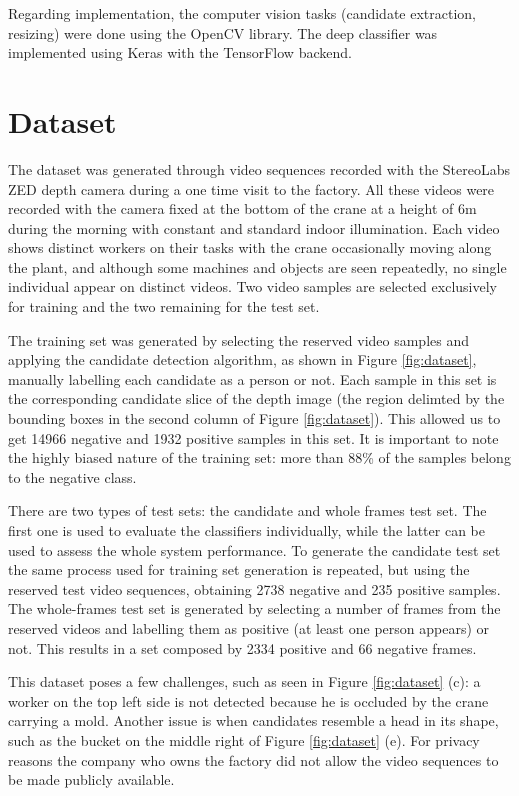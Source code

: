         Regarding implementation, the computer vision tasks (candidate extraction, resizing) were done using the OpenCV library. The deep classifier was implemented using Keras \cite{keras} with the TensorFlow \cite{tensorflow2015-whitepaper} backend.

\section{Dataset}
\label{sec:dataset}
The dataset was generated through video sequences recorded with the StereoLabs ZED depth camera during a one time visit to the factory. All these videos were recorded with the camera fixed at the bottom of the crane at a height of 6m during the morning with constant and standard indoor illumination. Each video shows distinct workers on their tasks with the crane occasionally moving along the plant, and although some machines and objects are seen repeatedly, no single individual appear on distinct videos. Two video samples are selected exclusively for training and the two remaining for the test set.

The training set was generated by selecting the reserved video samples and applying the candidate detection algorithm, as shown in Figure \ref{fig:dataset}, manually labelling each candidate as a person or not. Each sample in this set is the corresponding candidate slice of the depth image (the region delimted by the bounding boxes in the second column of Figure \ref{fig:dataset}). This allowed us to get 14966 negative and 1932 positive samples in this set. It is important to note the highly biased nature of the training set: more than 88\% of the samples belong to the negative class.

There are two types of test sets: the candidate and whole frames test set. The first one is used to evaluate the classifiers individually, while the latter can be used to assess the whole system performance. To generate the candidate test set the same process used for training set generation is repeated, but using the reserved test video sequences, obtaining 2738 negative and 235 positive samples. The whole-frames test set is generated by selecting a number of frames from the reserved videos and labelling them as positive (at least one person appears) or not. This results in a set composed by 2334 positive and 66 negative frames.

This dataset poses a few challenges, such as seen in Figure \ref{fig:dataset} (c): a worker on the top left side is not detected because he is occluded by the crane carrying a mold. Another issue is when candidates resemble a head in its shape, such as the bucket on the middle right of Figure \ref{fig:dataset} (e).  For privacy reasons the company who owns the factory did not allow the video sequences to be made publicly available.

